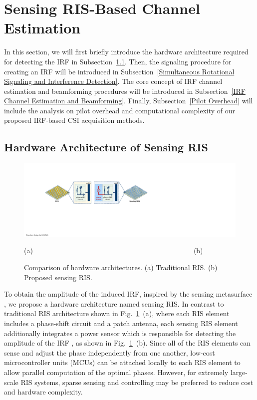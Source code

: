 \documentclass[conference,10pt,twocolumn]{IEEEtran}
\theoremstyle{nonumberplain}
\begin{document}
\section{Sensing RIS-Based Channel Estimation}
\label{Sensing RIS-Based Channel Estimation}
In this section, we will first briefly introduce the hardware architecture required for detecting the \ac{IRF} in Subsection~\ref{Hardware Architecture of Sensing RIS}. 
Then, the signaling procedure for creating an \ac{IRF} will be introduced in Subsection~\ref{Simultaneous Rotational Signaling and Interference Detection}.
The core concept of IRF channel estimation and beamforming procedures will be introduced in Subsection~\ref{IRF Channel Estimation and Beamforming}. 
Finally, Subsection~\ref{Pilot Overhead} will include the analysis on pilot overhead and computational complexity of our proposed IRF-based CSI acquisition methods. 

\subsection{Hardware Architecture of Sensing RIS} \label{Hardware Architecture of Sensing RIS}

    \begin{figure}[!t]
        \centering
        \includegraphics[width=.45\textwidth]{figures/hardware.pdf}
        \centerline{(a)~~~~~~~~~~~~~~~~~~~~~~~~~~~~~~~~~~~~~~~~~~~~~~(b)}
        \caption{Comparison of hardware architectures. (a) Traditional RIS. (b) Proposed sensing RIS.}
        \label{fig:hardware}
    \end{figure}
    
To obtain the amplitude of the induced \ac{IRF}, inspired by the sensing metasurface \cite{ma2019smart}, we propose a hardware architecture named sensing RIS.
In contrast to traditional RIS architecture shown in Fig.~\ref{fig:hardware}~(a), where each RIS element includes a phase-shift circuit and a patch antenna, each sensing RIS element additionally integrates a power sensor which is responsible for detecting the amplitude of the IRF \cite{ma2020smartsensing}, as shown in Fig.~\ref{fig:hardware}~(b).
Since all of the RIS elements can sense and adjust the phase independently from one another, low-cost microcontroller units (MCUs) can be attached locally to each RIS element to allow parallel computation of the optimal phases. 
However, for extremely large-scale RIS systems, sparse sensing and controlling may be preferred to reduce cost and hardware complexity. 
\end{document}
